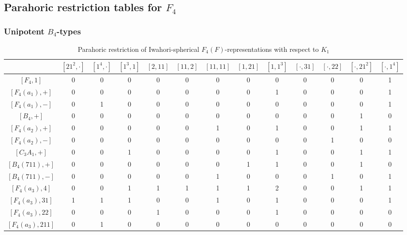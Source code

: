 \begin{landscape}
    
    \centering
    \subsection{Parahoric restriction tables for \texorpdfstring{$F_4$}{PDFstring}}
    \subsubsection*{Unipotent \texorpdfstring{$B_4$}{PDFstring}-types}
    \begin{table}[ht]
        \centering
        \caption{Parahoric restriction of Iwahori-spherical $F_4(F)$-representations with respect to $K_1$}\label{tbl:F4_K1_1}
        {\small
        \begin{tabular}{|c|cccccccccccc|}
            \hline
            & $[21^2,\cdot]$ & $[1^4,\cdot]$ & $[1^3,1]$ & $[2,11]$ & $[11,2]$ & $[11,11]$ & $[1,21]$ & $[1,1^3]$ & $[\cdot,31]$ & $[\cdot,22]$ & $[\cdot,21^2]$ & $[\cdot,1^4]$ \\\hline
            $[F_4,1]$ & 0 & 0 & 0 & 0 & 0 & 0 & 0 & 0 & 0 & 0 & 0 & 1\\\hline
            $[F_4(a_1),+]$ & 0 & 0 & 0 & 0 & 0 & 0 & 0 & 1 & 0 & 0 & 0 & 1\\
            $[F_4(a_1),-]$ & 0 & 1 & 0 & 0 & 0 & 0 & 0 & 0 & 0 & 0 & 0 & 1\\
            $[B_4,+]$ & 0 & 0 & 0 & 0 & 0 & 0 & 0 & 0 & 0 & 0 & 1 & 0\\\hline
            $[F_4(a_2),+]$ & 0 & 0 & 0 & 0 & 0 & 1 & 0 & 1 & 0 & 0 & 1 & 1\\
            $[F_4(a_2),-]$ & 0 & 0 & 0 & 0 & 0 & 0 & 0 & 0 & 0 & 1 & 0 & 0\\
            $[C_3A_1,+]$ & 0 & 0 & 1 & 0 & 0 & 0 & 0 & 1 & 0 & 0 & 1 & 1\\\hline
            $[B_4(711),+]$ & 0 & 0 & 0 & 0 & 0 & 0 & 1 & 1 & 0 & 0 & 1 & 0\\
            $[B_4(711),-]$ & 0 & 0 & 0 & 0 & 0 & 1 & 0 & 0 & 0 & 1 & 0 & 1\\\hline
            $[F_4(a_3),4]$ & 0 & 0 & 1 & 1 & 1 & 1 & 1 & 2 & 0 & 0 & 1 & 1\\
            $[F_4(a_3),31]$ & 1 & 1 & 1 & 0 & 0 & 1 & 0 & 1 & 0 & 0 & 0 & 1 \\
            $[F_4(a_3),22]$ & 0 & 0 & 0 & 1 & 0 & 0 & 0 & 1 & 0 & 0 & 0 & 0 \\
            $[F_4(a_3),211]$ & 0 & 1 & 0 & 0 & 0 & 0 & 0 & 0 & 0 & 0 & 0 & 0 \\

\end{tabular}}
\end{table}
\end{landscape}
